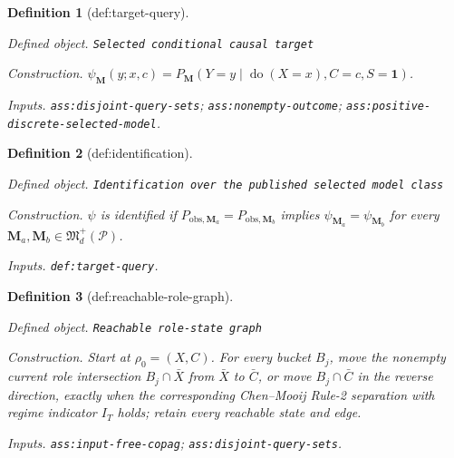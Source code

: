 \documentclass{article}
\newtheorem{definition}{Definition}
\begin{document}
\begin{definition}[def:target-query]\label{def:target-query}
\par\smallskip\noindent\emph{Defined object.} \texttt{Selected conditional causal target}
\par\smallskip\noindent\emph{Construction.} \(\psi_{\mathbf M}(y;x,c)=P_{\mathbf M}(Y=y\mid\operatorname{do}(X=x),C=c,S=\mathbf 1)\).
\par\smallskip\noindent\emph{Inputs.} \texttt{ass:\allowbreak{}disjoint-\allowbreak{}query-\allowbreak{}sets}; \texttt{ass:\allowbreak{}nonempty-\allowbreak{}outcome}; \texttt{ass:\allowbreak{}positive-\allowbreak{}discrete-\allowbreak{}selected-\allowbreak{}model}.
\end{definition}

\begin{definition}[def:identification]\label{def:identification}
\par\smallskip\noindent\emph{Defined object.} \texttt{Identification over the published selected model class}
\par\smallskip\noindent\emph{Construction.} \(\psi\) is identified if \(P_{\mathrm{obs},\mathbf M_a}=P_{\mathrm{obs},\mathbf M_b}\) implies \(\psi_{\mathbf M_a}=\psi_{\mathbf M_b}\) for every \(\mathbf M_a,\mathbf M_b\in\mathfrak M_d^+(\mathcal P)\).
\par\smallskip\noindent\emph{Inputs.} \texttt{def:\allowbreak{}target-\allowbreak{}query}.
\end{definition}

\begin{definition}[def:reachable-role-graph]\label{def:reachable-role-graph}
\par\smallskip\noindent\emph{Defined object.} \texttt{Reachable role-\allowbreak{}state graph}
\par\smallskip\noindent\emph{Construction.} Start at \(\rho_0=(X,C)\). For every bucket \(B_j\), move the nonempty current role intersection \(B_j\cap\bar X\) from \(\bar X\) to \(\bar C\), or move \(B_j\cap\bar C\) in the reverse direction, exactly when the corresponding Chen--Mooij Rule-2 separation with regime indicator \(I_T\) holds; retain every reachable state and edge.
\par\smallskip\noindent\emph{Inputs.} \texttt{ass:\allowbreak{}input-\allowbreak{}free-\allowbreak{}copag}; \texttt{ass:\allowbreak{}disjoint-\allowbreak{}query-\allowbreak{}sets}.
\end{definition}
\end{document}
